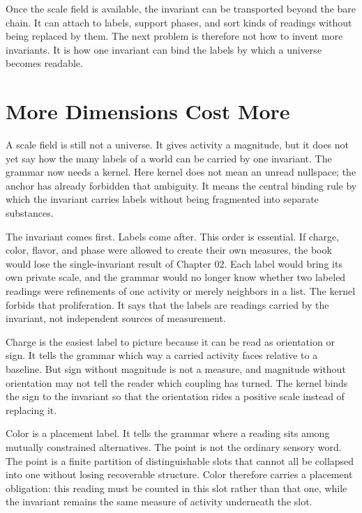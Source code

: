 Once the scale field is available, the invariant can be transported beyond
the bare chain. It can attach to labels, support phases, and sort kinds of
readings without being replaced by them. The next problem is therefore not
how to invent more invariants. It is how one invariant can bind the labels
by which a universe becomes readable.

\section{More Dimensions Cost More}

A scale field is still not a universe. It gives activity a magnitude, but it
does not yet say how the many labels of a world can be carried by one
invariant. The grammar now needs a kernel. Here kernel does not mean an
unread nullspace; the anchor has already forbidden that ambiguity. It means
the central binding rule by which the invariant carries labels without being
fragmented into separate substances.

The invariant comes first. Labels come after. This order is essential. If
charge, color, flavor, and phase were allowed to create their own measures,
the book would lose the single-invariant result of Chapter 02. Each label
would bring its own private scale, and the grammar would no longer know
whether two labeled readings were refinements of one activity or merely
neighbors in a list. The kernel forbids that proliferation. It says that the
labels are readings carried by the invariant, not independent sources of
measurement.

Charge is the easiest label to picture because it can be read as
orientation or sign. It tells the grammar which way a carried activity faces
relative to a baseline. But sign without magnitude is not a measure, and
magnitude without orientation may not tell the reader which coupling has
turned. The kernel binds the sign to the invariant so that the orientation
rides a positive scale instead of replacing it.

Color is a placement label. It tells the grammar where a reading sits among
mutually constrained alternatives. The point is not the ordinary sensory
word. The point is a finite partition of distinguishable slots that cannot
all be collapsed into one without losing recoverable structure. Color
therefore carries a placement obligation: this reading must be counted in
this slot rather than that one, while the invariant remains the same measure
of activity underneath the slot.

